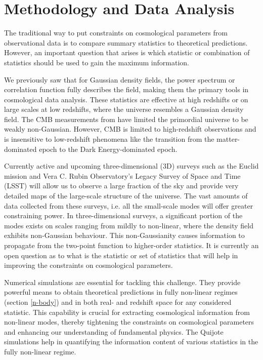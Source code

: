 \chapter{Methodology and Data Analysis}\label{method}
\justifying

The traditional way to put constraints on cosmological parameters from observational data is to compare summary statistics to theoretical predictions. However, an important question that arises is which statistic or combination of statistics should be used to gain the maximum information.

We previously saw that for Gaussian density fields, the power spectrum or correlation function fully describes the field, making them the primary tools in cosmological data analysis. These statistics are effective at high redshifts or on large scales at low redshifts, where the universe resembles a Gaussian density field. The CMB measurements from \cite{planckcollaboration2019planck2018resultsix} have limited the primordial universe to be weakly non-Gaussian. However, CMB is limited to high-redshift observations and is insensitive to low-redshift phenomena like the transition from the matter-dominated epoch to the Dark Energy-dominated epoch.

Currently active and upcoming three-dimensional (3D) surveys such as the Euclid mission\cite{EUCLID} and  Vera C. Rubin Observatory’s Legacy Survey of Space and Time (LSST) \cite{RubinObservatory} will allow us to observe a large fraction of the sky and provide very detailed maps of the large-scale structure of the universe. The vast amounts of data collected from these surveys, i.e. all the small-scale modes will offer greater constraining power. In three-dimensional surveys, a significant portion of the modes exists on scales ranging from mildly to non-linear, where the density field exhibits non-Gaussian behaviour. This non-Gaussianity causes information to propagate from the two-point function to higher-order statistics. It is currently an open question as to what is the statistic or set of statistics that will help in improving the constraints on cosmological parameters.

Numerical simulations are essential for tackling this challenge. They provide powerful means to obtain theoretical predictions in fully non-linear regimes (section \ref{n-body}) and in both real- and redshift space for any considered statistic. This capability is crucial for extracting cosmological information from non-linear modes, thereby tightening the constraints on cosmological parameters and enhancing our understanding of fundamental physics. The Quijote simulations help in quantifying the information content of various statistics in the fully non-linear regime.

